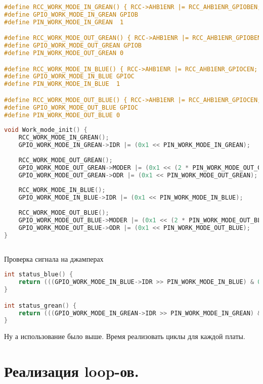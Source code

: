 \documentclass{bmstu}
\begin{document}
	\begingroup
	\fontsize{12pt}{12pt}\selectfont
	\begin{lstlisting}[language=C]
#define RCC_WORK_MODE_IN_GREAN() { RCC->AHB1ENR |= RCC_AHB1ENR_GPIOBEN; }
#define GPIO_WORK_MODE_IN_GREAN GPIOB
#define PIN_WORK_MODE_IN_GREAN  1

#define RCC_WORK_MODE_OUT_GREAN() { RCC->AHB1ENR |= RCC_AHB1ENR_GPIOBEN; }
#define GPIO_WORK_MODE_OUT_GREAN GPIOB
#define PIN_WORK_MODE_OUT_GREAN 0

#define RCC_WORK_MODE_IN_BLUE() { RCC->AHB1ENR |= RCC_AHB1ENR_GPIOCEN; }
#define GPIO_WORK_MODE_IN_BLUE GPIOC
#define PIN_WORK_MODE_IN_BLUE  1

#define RCC_WORK_MODE_OUT_BLUE() { RCC->AHB1ENR |= RCC_AHB1ENR_GPIOCEN; }
#define GPIO_WORK_MODE_OUT_BLUE GPIOC
#define PIN_WORK_MODE_OUT_BLUE 0
		
void Work_mode_init() {
	RCC_WORK_MODE_IN_GREAN();
	GPIO_WORK_MODE_IN_GREAN->IDR |= (0x1 << PIN_WORK_MODE_IN_GREAN);
	
	RCC_WORK_MODE_OUT_GREAN();
	GPIO_WORK_MODE_OUT_GREAN->MODER |= (0x1 << (2 * PIN_WORK_MODE_OUT_GREAN));
	GPIO_WORK_MODE_OUT_GREAN->ODR |= (0x1 << PIN_WORK_MODE_OUT_GREAN);
	
	RCC_WORK_MODE_IN_BLUE();
	GPIO_WORK_MODE_IN_BLUE->IDR |= (0x1 << PIN_WORK_MODE_IN_BLUE);
	
	RCC_WORK_MODE_OUT_BLUE();
	GPIO_WORK_MODE_OUT_BLUE->MODER |= (0x1 << (2 * PIN_WORK_MODE_OUT_BLUE));
	GPIO_WORK_MODE_OUT_BLUE->ODR |= (0x1 << PIN_WORK_MODE_OUT_BLUE);
}
	\end{lstlisting}
	\endgroup
	\subsection{}
	
	Проверка сигнала на джамперах
	
	\begingroup
	\fontsize{12pt}{12pt}\selectfont
	\begin{lstlisting}[language=C]
int status_blue() {
	return (((GPIO_WORK_MODE_IN_BLUE->IDR >> PIN_WORK_MODE_IN_BLUE) & 0x01) == 1);
}

int status_grean() {
	return (((GPIO_WORK_MODE_IN_GREAN->IDR >> PIN_WORK_MODE_IN_GREAN) & 0x01) == 1);
}
	\end{lstlisting}
	\endgroup
	
	Ну а использование было выше. Время реализовать циклы для каждой платы.
	
	\section{Реализация loop-ов.}
	
\end{document}
